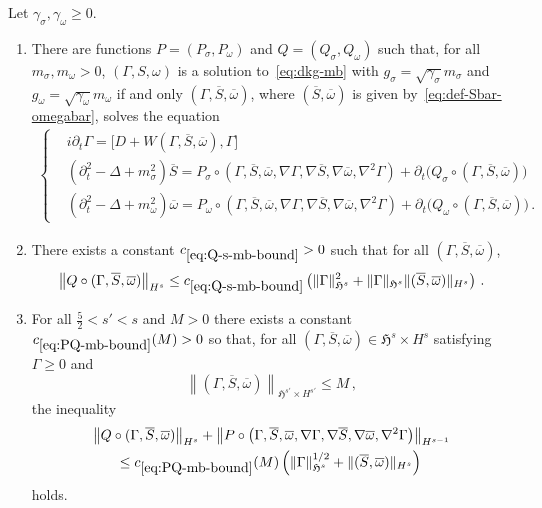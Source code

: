 \documentclass[AHL,Unicode,longabstracts,published]{cedram}
\renewcommand\bar{\overline}
\newcommand{\gH}{\mathfrak{H}}
\newcommand*{\romanenumi}{\renewcommand*{\theenumi}{\roman{enumi}}}
\begin{document}
\begin{lemm}\label{lem:red-eq-mb}
Let $\gamma_\sigma, \gamma_\omega\geq 0$.
\begin{enumerate}\romanenumi
\item There are functions $P=(P_\sigma,P_\omega)$ and $Q=(Q_\sigma, Q_\omega)$ such that, for all $m_\sigma, m_\omega>0$, $(\Gamma,S,\omega)$ is a solution to~\eqref{eq:dkg-mb} with $g_\sigma=\sqrt{\gamma_\sigma}m_\sigma$ and $g_\omega=\sqrt{\gamma_\omega}m_\omega$ if and only $(\Gamma,\overline{S},\overline{\omega})$, where $(\bar{S},\bar{\omega})$ is given by~\eqref{eq:def-Sbar-omegabar}, solves the equation
\begin{align}\label{eq:D-F-PQ}
\left\{
\begin{aligned}
&i\partial_t \Gamma=\big[D + W(\Gamma, \overline{S}, \overline{\omega}),\Gamma] \\
&\left(\partial_t^2-\Delta + m_\sigma^2\right)\overline{S} = P_\sigma\circ \left(\Gamma, \overline{S}, \overline{\omega}, \nabla\Gamma, \nabla \overline{S}, \nabla \overline{\omega}, \nabla^2 \Gamma\right) + \partial_t \big(Q_\sigma\circ (\Gamma, \overline{S}, \overline{\omega})\big)\\
&\left(\partial_t^2-\Delta + m_\omega^2\right)\overline{\omega} = P_\omega\circ \left(\Gamma, \overline{S}, \overline{\omega}, \nabla\Gamma, \nabla \overline{S}, \nabla \overline{\omega},\nabla^2 \Gamma\right) + \partial_t \big(Q_\omega\circ(\Gamma, \overline{S}, \overline{\omega})\big)\,.
\end{aligned}
\right.
\end{align}
\item There exists a constant $c_{\eqref{eq:Q-s-mb-bound}}>0$ such that for all $(\Gamma,\overline{S}, \overline{\omega})$,
\begin{equation}\label{eq:Q-s-mb-bound}
\left\| Q\circ(\Gamma,\overline{S}, \overline{\omega})\right\|_{H^s} \leq c_{\eqref{eq:Q-s-mb-bound}} \left(\|\Gamma\|^2_{\gH^{s}} + \|\Gamma\|_{\gH^{s}} \|(\overline{S}, \overline{\omega})\|_{H^s}\right)\,.
\end{equation}
\item For all $\tfrac52<s'<s$ and $M>0$ there exists a constant $c_{\eqref{eq:PQ-mb-bound}}(M)>0$ so that, for all $(\Gamma,\overline{S}, \overline{\omega})\in \gH^s \times H^{s}$ satisfying $\Gamma\geq 0$ and
\begin{equation*}
\left\|(\Gamma,\overline{S}, \overline{\omega})\right\|_{\gH^{s'}\times H^{s'}} \leq M\,,
\end{equation*}
the inequality
\begin{multline}\label{eq:PQ-mb-bound}
\left\| Q \circ(\Gamma,\overline{S}, \overline{\omega})\right\|_{H^s} +\left\| P\circ\left(\Gamma, \overline{S}, \overline{\omega}, \nabla\Gamma, \nabla \overline{S}, \nabla \overline{\omega},\nabla^2 \Gamma\right)\right\|_{H^{s-1}} \\
\leq c_{\eqref{eq:PQ-mb-bound}}(M)\left(\|\Gamma\|_{\gH^s}^{1/2}+\|(\overline{S},\overline{\omega})\|_{H^{s}}\right)\,
\end{multline}
holds.
\end{enumerate}
\end{lemm}
\end{document}

